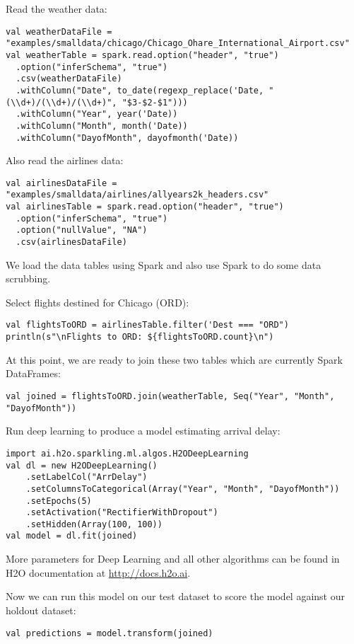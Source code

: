 \newpage
Read the weather data:

\begin{lstlisting}[style=Scala]
val weatherDataFile = "examples/smalldata/chicago/Chicago_Ohare_International_Airport.csv"
val weatherTable = spark.read.option("header", "true")
  .option("inferSchema", "true")
  .csv(weatherDataFile)
  .withColumn("Date", to_date(regexp_replace('Date, "(\\d+)/(\\d+)/(\\d+)", "$3-$2-$1")))
  .withColumn("Year", year('Date))
  .withColumn("Month", month('Date))
  .withColumn("DayofMonth", dayofmonth('Date))
\end{lstlisting}

Also read the airlines data:

\begin{lstlisting}[style=Scala]
val airlinesDataFile = "examples/smalldata/airlines/allyears2k_headers.csv"
val airlinesTable = spark.read.option("header", "true")
  .option("inferSchema", "true")
  .option("nullValue", "NA")
  .csv(airlinesDataFile)
\end{lstlisting}

We load the data tables using Spark and also use Spark to do some data scrubbing.

Select flights destined for Chicago (ORD):
\begin{lstlisting}[style=Scala]
val flightsToORD = airlinesTable.filter('Dest === "ORD")
println(s"\nFlights to ORD: ${flightsToORD.count}\n")
\end{lstlisting}

At this point, we are ready to join these two tables which are currently Spark DataFrames:
\begin{lstlisting}[style=Scala]
val joined = flightsToORD.join(weatherTable, Seq("Year", "Month", "DayofMonth"))
\end{lstlisting}

\newpage
Run deep learning to produce a model estimating arrival delay:

\begin{lstlisting}[style=Scala]
import ai.h2o.sparkling.ml.algos.H2ODeepLearning
val dl = new H2ODeepLearning()
    .setLabelCol("ArrDelay")
    .setColumnsToCategorical(Array("Year", "Month", "DayofMonth"))
    .setEpochs(5)
    .setActivation("RectifierWithDropout")
    .setHidden(Array(100, 100))
val model = dl.fit(joined)
\end{lstlisting}

More parameters for Deep Learning and all other algorithms can be found in H2O documentation at \url{http://docs.h2o.ai}.

Now we can run this model on our test dataset to score the model against our holdout dataset:
\begin{lstlisting}[style=Scala]
val predictions = model.transform(joined)
\end{lstlisting}

